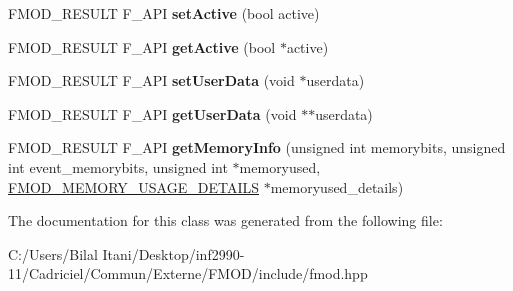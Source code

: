 \begin{DoxyCompactItemize}
\item 
F\+M\+O\+D\+\_\+\+R\+E\+S\+U\+LT F\+\_\+\+A\+PI {\bfseries set\+Active} (bool active)\hypertarget{class_f_m_o_d_1_1_reverb_ace7f7f68d6f6298a356b9ee831f50aae}{}\label{class_f_m_o_d_1_1_reverb_ace7f7f68d6f6298a356b9ee831f50aae}

\item 
F\+M\+O\+D\+\_\+\+R\+E\+S\+U\+LT F\+\_\+\+A\+PI {\bfseries get\+Active} (bool $\ast$active)\hypertarget{class_f_m_o_d_1_1_reverb_a50f3bbcec09517e400fa606330738e2b}{}\label{class_f_m_o_d_1_1_reverb_a50f3bbcec09517e400fa606330738e2b}

\item 
F\+M\+O\+D\+\_\+\+R\+E\+S\+U\+LT F\+\_\+\+A\+PI {\bfseries set\+User\+Data} (void $\ast$userdata)\hypertarget{class_f_m_o_d_1_1_reverb_ad29004efcf52bf367bc13fde07527647}{}\label{class_f_m_o_d_1_1_reverb_ad29004efcf52bf367bc13fde07527647}

\item 
F\+M\+O\+D\+\_\+\+R\+E\+S\+U\+LT F\+\_\+\+A\+PI {\bfseries get\+User\+Data} (void $\ast$$\ast$userdata)\hypertarget{class_f_m_o_d_1_1_reverb_ac12115e79aebe3f8150c971b75de38c7}{}\label{class_f_m_o_d_1_1_reverb_ac12115e79aebe3f8150c971b75de38c7}

\item 
F\+M\+O\+D\+\_\+\+R\+E\+S\+U\+LT F\+\_\+\+A\+PI {\bfseries get\+Memory\+Info} (unsigned int memorybits, unsigned int event\+\_\+memorybits, unsigned int $\ast$memoryused, \hyperlink{struct_f_m_o_d___m_e_m_o_r_y___u_s_a_g_e___d_e_t_a_i_l_s}{F\+M\+O\+D\+\_\+\+M\+E\+M\+O\+R\+Y\+\_\+\+U\+S\+A\+G\+E\+\_\+\+D\+E\+T\+A\+I\+LS} $\ast$memoryused\+\_\+details)\hypertarget{class_f_m_o_d_1_1_reverb_a9be1262ba585537bdd32e569eb999d05}{}\label{class_f_m_o_d_1_1_reverb_a9be1262ba585537bdd32e569eb999d05}

\end{DoxyCompactItemize}


The documentation for this class was generated from the following file\+:\begin{DoxyCompactItemize}
\item 
C\+:/\+Users/\+Bilal Itani/\+Desktop/inf2990-\/11/\+Cadriciel/\+Commun/\+Externe/\+F\+M\+O\+D/include/fmod.\+hpp\end{DoxyCompactItemize}
